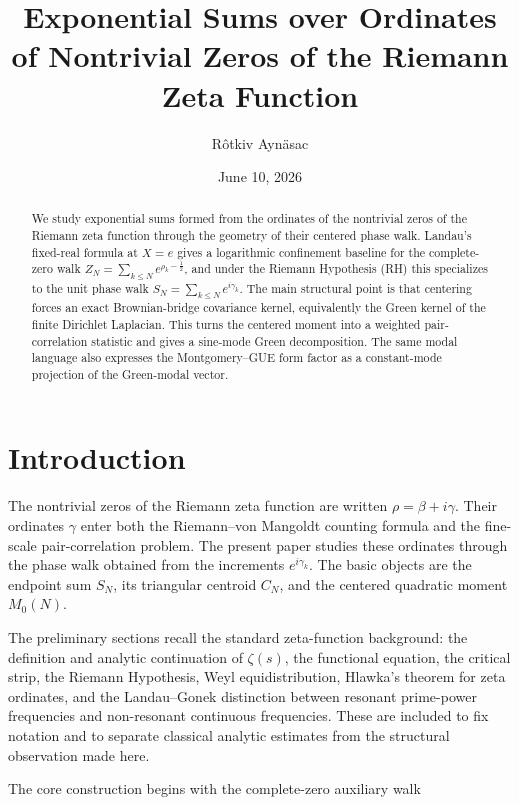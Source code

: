 \documentclass[11pt]{amsart}
\title{Exponential Sums over Ordinates of Nontrivial Zeros of the Riemann Zeta Function}
\author{R\^otkiv Ayn\"asac}
\date{June 10, 2026}
\numberwithin{equation}{section}
\theoremstyle{plain}
\theoremstyle{definition}
\theoremstyle{remark}
\begin{document}
\begin{abstract}
We study exponential sums formed from the ordinates of the nontrivial
zeros of the Riemann zeta function through the geometry of their
centered phase walk. Landau's fixed-real formula at \(X=e\) gives a
logarithmic confinement baseline for
the complete-zero walk
\(Z_N=\sum_{k\le N}e^{\rho_k-\frac12}\), and under the Riemann Hypothesis
(RH) this specializes to the unit phase walk
\(S_N=\sum_{k\le N}e^{i\gamma_k}\). The main structural point is that
centering forces an exact Brownian-bridge covariance kernel,
equivalently the Green kernel of the finite Dirichlet Laplacian. This
turns the centered moment into a weighted pair-correlation statistic and
gives a sine-mode Green decomposition. The same modal language also
expresses the Montgomery--GUE form factor as a constant-mode projection
of the Green-modal vector. 
\end{abstract}

\maketitle

\tableofcontents

\bigskip

\section{Introduction}
\label{sec:introduction}

The nontrivial zeros of the Riemann zeta function are written
\(\rho=\beta+i\gamma\). Their ordinates \(\gamma\) enter both the
Riemann--von Mangoldt counting formula and the fine-scale
pair-correlation problem. The present paper studies these ordinates
through the phase walk obtained from the increments \(e^{i\gamma_k}\).
The basic objects are the endpoint sum \(S_N\), its triangular centroid
\(C_N\), and the centered quadratic moment \(M_0(N)\).

The preliminary sections recall the standard zeta-function background:
the definition and analytic continuation of \(\zeta(s)\), the functional
equation, the critical strip, the Riemann Hypothesis, Weyl
equidistribution, Hlawka's theorem for zeta ordinates, and the
Landau--Gonek distinction between resonant prime-power frequencies and
non-resonant continuous frequencies. These are included to fix notation
and to separate classical analytic estimates from the structural observation
made here.

The core construction begins with the complete-zero auxiliary walk
\end{document}
